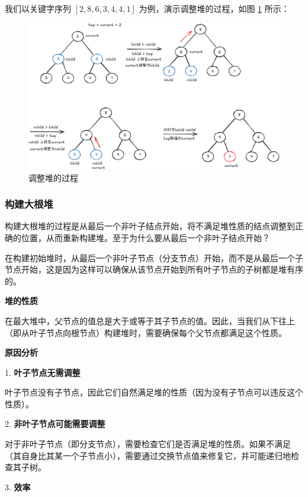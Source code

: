 \documentclass[lang=cn,newtx,10pt,scheme=chinese]{../elegantbook}
\begin{document}
我们以关键字序列 $[2,8,6,3,4,4,1]$ 为例，演示调整堆的过程，如图 \ref{fig:adjustHeap} 所示：

\begin{figure}
[h!]
    \centering
    \includegraphics[width=1\textwidth]{./figure/pdf/cropped/heapAdjust.pdf}
    \caption{调整堆的过程}
    \label{fig:adjustHeap}
\end{figure}

\subsubsection{构建大根堆}

构建大根堆的过程是从最后一个非叶子结点开始，将不满足堆性质的结点调整到正确的位置，从而重新构建堆。至于为什么要从最后一个非叶子结点开始？

在构建初始堆时，从最后一个非叶子节点（分支节点）开始，而不是从最后一个子节点开始，这是因为这样可以确保从该节点开始到所有叶子节点的子树都是堆有序的。


\textbf{堆的性质}  

在最大堆中，父节点的值总是大于或等于其子节点的值。因此，当我们从下往上（即从叶子节点向根节点）构建堆时，需要确保每个父节点都满足这个性质。


\textbf{原因分析}  

1. \textbf{叶子节点无需调整}  

   叶子节点没有子节点，因此它们自然满足堆的性质（因为没有子节点可以违反这个性质）。

2. \textbf{非叶子节点可能需要调整}  

   对于非叶子节点（即分支节点），需要检查它们是否满足堆的性质。如果不满足（其自身比其某一个子节点小），需要通过交换节点值来修复它，并可能递归地检查其子树。

3. \textbf{效率}  
\end{document}
